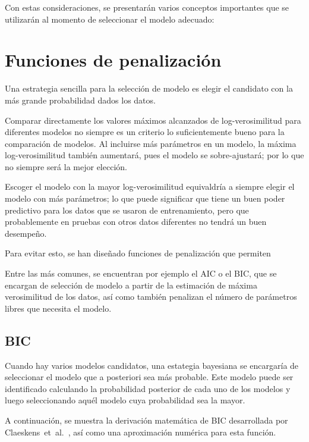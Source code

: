 Con estas consideraciones, se presentarán varios conceptos importantes que se utilizarán al momento de seleccionar el modelo adecuado:

\section{Funciones de penalización}

Una estrategia sencilla para la selección de modelo es elegir el candidato con la más grande probabilidad dados los datos. 

Comparar directamente los valores máximos alcanzados de log-verosimilitud para diferentes modelos no siempre es un criterio lo suficientemente bueno para la comparación de modelos. Al incluirse más parámetros en un modelo, la máxima log-verosimilitud también aumentará, pues el modelo se sobre-ajustará; por lo que no siempre será la mejor elección. 

Escoger el modelo con la mayor log-verosimilitud equivaldría a siempre elegir el modelo con más parámetros; lo que puede significar que tiene un buen poder predictivo para los datos que se usaron de entrenamiento, pero que probablemente en pruebas con otros datos diferentes no tendrá un buen desempeño.

Para evitar esto, se han diseñado funciones de penalización que permiten 

Entre las más comunes, se encuentran por ejemplo el \acf{AIC} o el \acf{BIC}, que se encargan de selección de modelo a partir de la estimación de máxima verosimilitud de los datos, así como también penalizan el número de parámetros libres que necesita el modelo.

\subsection{BIC}

Cuando hay varios modelos candidatos, una estategia bayesiana se encargaría de seleccionar el modelo que a posteriori sea más probable. Este modelo puede ser identificado calculando la probabilidad posterior de cada uno de los modelos y luego seleccionando aquél modelo cuya probabilidad sea la mayor.

A continuación, se muestra la derivación matemática de BIC desarrollada por Claeskens~et~al.~\cite{Claeskens2010}, así como una aproximación numérica para esta función. 

